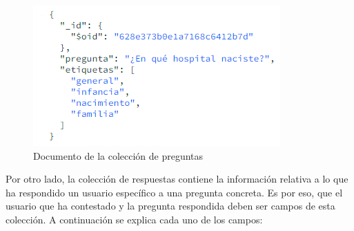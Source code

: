 \begin{figure}[h]
	\centering
	\includegraphics[scale=1.3]{Imagenes/Vectorial/mongo_pregunta}
	\caption{Documento de la colección de preguntas}
	\label{fig:mongo_preg}
\end{figure}

Por otro lado, la colección de respuestas contiene la información relativa a lo que ha respondido un usuario específico a una pregunta concreta. Es por eso, que el usuario que ha contestado y la pregunta respondida deben ser campos de esta colección. A continuación se explica cada uno de los campos:

